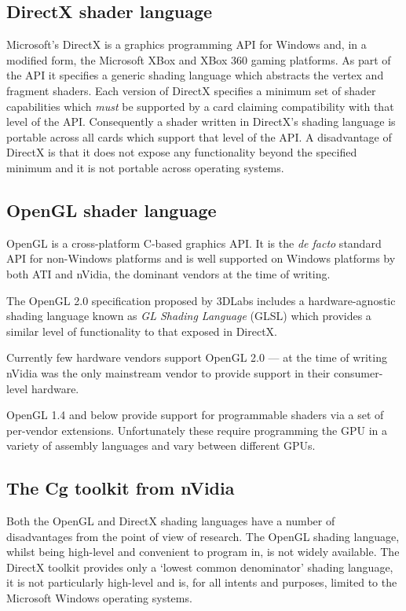 \subsection{DirectX shader language}

Microsoft's DirectX\cite{GPU:DirectX} is a graphics programming API for
Windows and, in a modified form, the Microsoft XBox and XBox 360 gaming platforms. As part of
the API it specifies a generic shading language\cite{GPU:DirectXShadingLanguage}
which abstracts the vertex and fragment shaders. Each version of DirectX
specifies a minimum set of shader capabilities which \emph{must} be supported by a 
card claiming compatibility with that level of the API. Consequently a shader written in
DirectX's shading language is portable across all cards which support that level
of the API. A disadvantage of DirectX is that it does not expose any functionality
beyond the specified minimum and it is not portable across operating systems.

\subsection{OpenGL shader language}

OpenGL\cite{GPU:OpenGLSpec} is a cross-platform C-based graphics API. 
It is the \emph{de facto} standard API for non-Windows platforms and
is well supported on Windows platforms by both ATI and nVidia, the dominant
vendors at the time of writing. 

The OpenGL 2.0 specification\cite{GPU:OpenGL2Overview} proposed by 3DLabs
includes a hardware-agnostic shading language\cite{GPU:OpenGLShadingLanguage}
known as \emph{GL Shading Language} (GLSL) which provides a similar level
of functionality to that exposed in DirectX. 

Currently few hardware vendors support OpenGL 2.0 --- at the time of writing
nVidia was the only mainstream vendor to provide support in their
consumer-level hardware\cite{nvidia:7664relnotes}.

OpenGL 1.4 and below provide support for programmable shaders via a set of per-vendor
extensions. Unfortunately these require programming the GPU in a variety of
assembly languages and vary between different GPUs.

\subsection{The Cg toolkit from nVidia}

Both the OpenGL and DirectX shading languages have a number of disadvantages
from the point of view of research. The OpenGL shading language, whilst being
high-level and convenient to program in, is not widely available. The
DirectX toolkit provides only a `lowest common denominator' shading language,
it is not particularly high-level and is, for all intents and purposes, limited
to the Microsoft Windows operating systems. 

